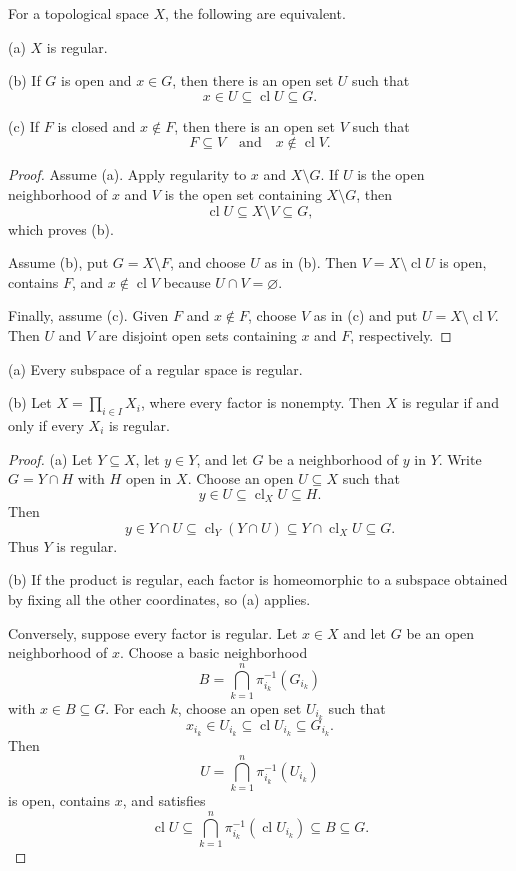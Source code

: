 \begin{thm}
For a topological space $X$, the following are equivalent.

(a) $X$ is regular.

(b) If $G$ is open and $x\in G$, then there is an open set $U$ such that
\[
x\in U\subseteq\operatorname{cl}U\subseteq G.
\]

(c) If $F$ is closed and $x\notin F$, then there is an open set $V$ such that
\[
F\subseteq V
\quad\text{and}\quad
x\notin\operatorname{cl}V.
\]
\end{thm}

\begin{proof}
Assume (a). Apply regularity to $x$ and $X\setminus G$. If $U$ is the open
neighborhood of $x$ and $V$ is the open set containing $X\setminus G$, then
\[
\operatorname{cl}U\subseteq X\setminus V\subseteq G,
\]
which proves (b).

Assume (b), put $G=X\setminus F$, and choose $U$ as in (b). Then
$V=X\setminus\operatorname{cl}U$ is open, contains $F$, and
$x\notin\operatorname{cl}V$ because $U\cap V=\varnothing$.

Finally, assume (c). Given $F$ and $x\notin F$, choose $V$ as in (c) and put
$U=X\setminus\operatorname{cl}V$. Then $U$ and $V$ are disjoint open sets
containing $x$ and $F$, respectively.
\end{proof}

\begin{thm}
(a) Every subspace of a regular space is regular.

(b) Let $X=\prod_{i\in I}X_i$, where every factor is nonempty. Then $X$ is
regular if and only if every $X_i$ is regular.
\end{thm}

\begin{proof}
(a) Let $Y\subseteq X$, let $y\in Y$, and let $G$ be a neighborhood of $y$ in
$Y$. Write $G=Y\cap H$ with $H$ open in $X$. Choose an open $U\subseteq X$
such that
\[
y\in U\subseteq\operatorname{cl}_XU\subseteq H.
\]
Then
\[
y\in Y\cap U\subseteq
\operatorname{cl}_Y(Y\cap U)\subseteq
Y\cap\operatorname{cl}_XU\subseteq G.
\]
Thus $Y$ is regular.

(b) If the product is regular, each factor is homeomorphic to a subspace
obtained by fixing all the other coordinates, so (a) applies.

Conversely, suppose every factor is regular. Let $x\in X$ and let $G$ be an
open neighborhood of $x$. Choose a basic neighborhood
\[
B=\bigcap_{k=1}^n\pi_{i_k}^{-1}(G_{i_k})
\]
with $x\in B\subseteq G$. For each $k$, choose an open set $U_{i_k}$ such
that
\[
x_{i_k}\in U_{i_k}\subseteq
\operatorname{cl}U_{i_k}\subseteq G_{i_k}.
\]
Then
\[
U=\bigcap_{k=1}^n\pi_{i_k}^{-1}(U_{i_k})
\]
is open, contains $x$, and satisfies
\[
\operatorname{cl}U\subseteq
\bigcap_{k=1}^n\pi_{i_k}^{-1}(\operatorname{cl}U_{i_k})
\subseteq B\subseteq G.
\]
\end{proof}

